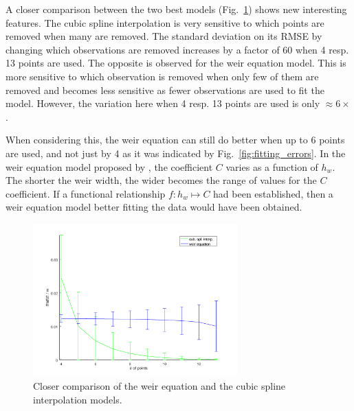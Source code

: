A closer comparison between the two best models (Fig.~\ref{fig:fitting_std}) shows new interesting features.
The cubic spline interpolation is very sensitive to which points are removed when many are removed.
The standard deviation on its RMSE by changing which observations are removed increases by a factor of \num{60} when \num{4} resp. \num{13} points are used.
The opposite is observed for the weir equation model.
This is more sensitive to which observation is removed when only few of them are removed and becomes less sensitive as fewer observations are used to fit the model.
However, the variation here when \num{4} resp. \num{13} points are used is only $\approx \num{6} \times$.

When considering this, the weir equation can still do better when up to \num{6} points are used, and not just by \num{4} as it was indicated by Fig.~\ref{fig:fitting_errors}.
In the weir equation model proposed by \cite{brown_urban_2009}, the coefficient $C$ varies as a function of $h_w$.
The shorter the weir width, the wider becomes the range of values for the $C$ coefficient.
If a functional relationship $f:h_w \mapsto C$ had been established, then a weir equation model better fitting the data would have been obtained.


\begin{figure}[h]
  \centering
  \includegraphics[width=0.7\textwidth]{Figures/fitting_std.png}
  \caption{Closer comparison of the weir equation and the cubic spline interpolation models.}
  \label{fig:fitting_std}
\end{figure}


